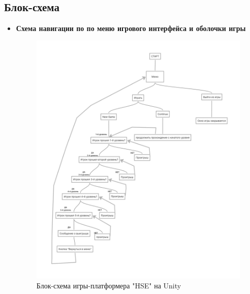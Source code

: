 \documentclass{article}
\begin{document}
\subsection*{Блок-схема}

\begin{itemize}
    \item \textbf{Схема навигации по по меню игрового интерфейса и оболочки игры} \\
   \begin{figure}[h]
    \centering
    \includegraphics[width=1.0\linewidth]{схема.png}
    \caption{Блок-схема игры-платформера "HSE" на Unity}
    \label{fig:mpr}
    \end{figure}
\end{itemize}
\end{document}
